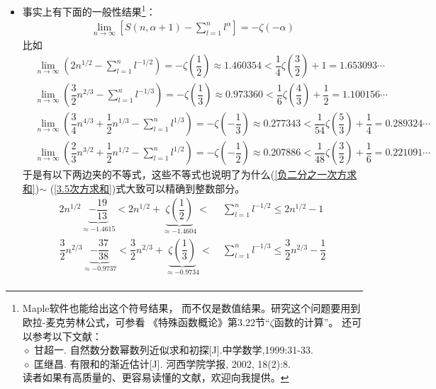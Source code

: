 \begin{itemize}[leftmargin=\inteval{\myitemleftmargin}pt,itemsep=
   \inteval{\myitemitempsep}pt,topsep=\inteval{\myitemtopsep}pt]
\item 事实上有下面的一般性结果\footnote{Maple软件也能给出这个符号结果，
而不仅是数值结果。研究这个问题要用到欧拉-麦克劳林公式，可参看
《特殊函数概论》第3.22节“$ \zeta $函数的计算”。 还可以参考以下文献：\\
$ \diamond $ 甘超一. 自然数分数幂数列近似求和初探[J].中学数学,1999:31-33.\\
$ \diamond $ 匡继昌. 有限和的渐近估计[J]. 河西学院学报, 2002, 18(2):8. \\
读者如果有高质量的、更容易读懂的文献，欢迎向我提供。}：
\begin{gather}\label{Maple发现的极限}
    \lim\limits_{n\to \infty} \left[ S(n,\alpha+1)
    -\sum\limits_{l=1}^{n} l^{\alpha}\right]=-\zeta(-\alpha)
\end{gather}
比如
\begin{align*}
    & \lim\limits_{n\to \infty}\left(2n^{1/2}
    -\sum\limits_{l=1}^{n} l^{-1/2}\right)=-\zeta\left(
    \dfrac{1}{2}\right) \approx 1.460354<\dfrac{1}{4}\zeta\left(
    \dfrac{3}{2}\right)+1=1.653093\cdots \\
    & \lim\limits_{n\to \infty}\left(\dfrac{3}{2}n^{2/3}
    -\sum\limits_{l=1}^{n} l^{-1/3}\right)=-\zeta\left(
    \dfrac{1}{3}\right) \approx 0.973360<\dfrac{1}{6}\zeta\left(
    \dfrac{4}{3}\right)+\dfrac{1}{2}=1.100156\cdots \\
    & \lim\limits_{n\to \infty}\left(\dfrac{3}{4}n^{4/3}+\dfrac{1}{2}
    n^{1/3}-\sum\limits_{l=1}^{n} l^{1/3}\right)=-\zeta\left(
    -\dfrac{1}{3}\right) \approx 0.277343<\dfrac{1}{54}\zeta\left(
    \dfrac{5}{3}\right)+\dfrac{1}{4}=0.289324\cdots \\    
    & \lim\limits_{n\to \infty} \left(\dfrac{2}{3}n^{3/2}+
    \dfrac{1}{2}n^{1/2}-\sum\limits_{l=1}^{n} l^{1/2}\right)
    =-\zeta\left(-\dfrac{1}{2}\right)\approx 0.207886
    <\dfrac{1}{48}\zeta\left(
    \dfrac{3}{2}\right)+\dfrac{1}{6}=0.221091\cdots
\end{align*}
于是有以下两边夹的不等式，这些不等式也说明了为什么(\ref{负二分之一次方求和})$ \sim $
(\ref{3.5次方求和})式大致可以精确到整数部分。
\begin{align}
    2n^{1/2}\underbrace{-\dfrac{19}{13}}_{\approx -1.4615}
    <2n^{1/2}+\underbrace{\zeta\left(\dfrac{1}{2}\right)}_{\approx -1.4604}
    < &\ \sum\limits_{l=1}^{n} l^{-1/2}\leq 2n^{1/2}-1  \\  
    \dfrac{3}{2}n^{2/3}\underbrace{-\dfrac{37}{38}}_{\approx -0.9737}
    <\dfrac{3}{2}n^{2/3}+
    \underbrace{\zeta\left(\dfrac{1}{3}\right)}_{\approx -0.9734}
    < &\ \sum\limits_{l=1}^{n} l^{-1/3}\leq \dfrac{3}{2}n^{2/3}-\dfrac{1}{2}  \\ 

\end{align}
\end{itemize}
